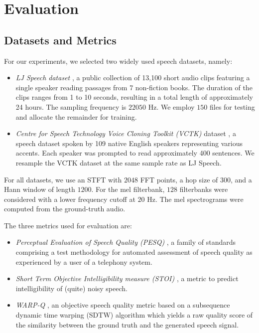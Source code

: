 \section{Evaluation}\label{sec:experiments}
\subsection{Datasets and Metrics}


For our experiments, we selected two widely used speech datasets, namely: 
\begin{itemize} %
    \item \textit{LJ Speech dataset} \cite{ljspeech17}, a public collection of 13,100 short audio clips featuring a single speaker reading passages from 7 non-fiction books. %
    The duration of the clips ranges from 1 to 10 seconds, resulting in a total length of approximately 24 hours. The sampling frequency is $22050$ Hz. We employ $150$ files for testing and allocate the remainder for training.
    \item \textit{Centre for Speech Technology Voice Cloning Toolkit (VCTK)} dataset \cite{Yamagishi2019CSTRVC}, a speech dataset spoken by 109 native English speakers representing various accents.
    Each speaker was prompted to read approximately 400 sentences. %
    We resample the VCTK dataset at the same sample rate as LJ Speech.
\end{itemize}
For all datasets, we use an STFT with $2048$ FFT points, a hop size of $300$, and a Hann window of length $1200$.
For the mel filterbank, $128$ filterbanks were considered with a lower frequency cutoff at $20$ Hz. The mel spectrograms were computed from the ground-truth audio.%

The three metrics used for evaluation are: 
\begin{itemize} %
    \item \textit{Perceptual Evaluation of Speech Quality (PESQ)} \cite{pesq},
    a family of standards comprising a test methodology for automated assessment of speech quality as experienced by a user of a telephony system. 
    \item \textit{Short Term Objective Intelligibility measure (STOI)} \cite{stoi}, a metric to predict intelligibility of (quite) noisy speech.%
    \item \textit{WARP-Q} \cite{warpQ}, an objective speech quality metric based on a subsequence dynamic time warping (SDTW) algorithm which yields a raw quality score of the similarity between the ground truth and the generated speech signal.
\end{itemize}



